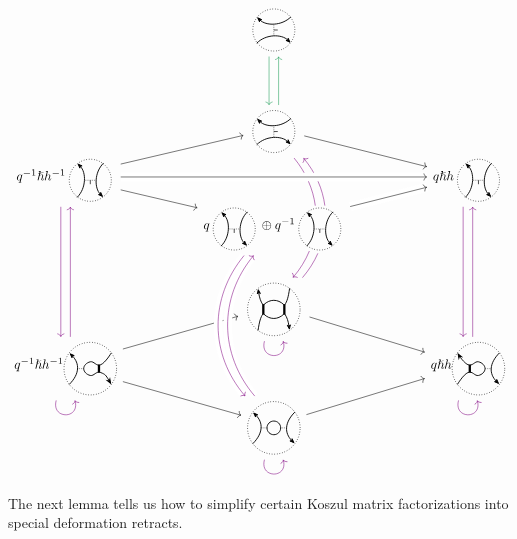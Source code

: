 \documentclass{article}
\theoremstyle{plain} %
\theoremstyle{definition} %
\theoremstyle{remark} %
\begin{document}
\[\label{r2bsdr}
\begin{tikzcd}[row sep=-0.1cm, column sep=2cm]
	&
	\scalebox{0.7}{\UnorientedVerticalThinEdge{}{}{}{}}
	\arrow[d, color=ForestGreen, shift right=1.5]
	&
	\\[4em]&
	\scalebox{0.7}{\UnorientedVerticalThinEdge{}{}{}{}}
	\arrow[dr]
	\arrow[ddd, bend left=40, color=violet, shift right=1.5, dash pattern=on 40pt off 35pt]
	\arrow[leftarrow, ddd, bend left=40, color=violet, shift left=1.5, dash pattern=on 39.5pt off 37pt]
	\arrow[u, color=ForestGreen, shift right=1.5]
	&
	\\
	q^{-1}\hslash h^{-1}\scalebox{0.7}{\UnorientedHorizontalThinEdge{}{}{}{}} 
	\arrow[dr]
	\arrow[ur]
	\arrow[ddd, color=violet, shift right=1.5]
	&
	&
	q\hslash h\scalebox{0.7}{\UnorientedHorizontalThinEdge{}{}{}{}}
	\arrow[ddd, color=violet, shift right=1.5]
	\\
	& 
	q\scalebox{0.7}{\UnorientedHorizontalThinEdge{}{}{}{}}\oplus q^{-1}\scalebox{0.7}{\UnorientedHorizontalThinEdge{}{}{}{}}
	\arrow[ur, crossing over] 
	&
	\\[2em]
	& 
	\scalebox{0.7}{\Square{}{}{}{}{}{}}
	\arrow[loop right, distance=1.5em, in=-75, out=-105, color=violet]
	\arrow[dr]
	&
	\\
	q^{-1}\hslash h^{-1}\scalebox{0.7}{\ThinThickUnoriented{}{}{}{}{}} 
	\arrow[loop right, distance=1.5em, in=-75, out=-105, color=violet]
	\arrow[ur]
	\arrow[dr]
	\arrow[uuu, color=violet, shift right=1.5]
	&& 
	q\hslash h\scalebox{0.7}{\ThickThinUnoriented{}{}{}{}{}}
	\arrow[uuu, color=violet, shift right=1.5]
	\arrow[loop right, distance=1.5em, in=-75, out=-105, color=violet]
	\\
	& 
	\scalebox{0.7}{\ThinThinUnoriented{}{}{}{}{}} 
	\arrow[ur]
	\arrow[loop right, distance=1.5em, in=-75, out=-105, color=violet] 
	&
	\arrow[ddd, from=4-2, to=7-2, bend right=40, crossing over, color=violet, shift right=1.5] 
	\arrow[uuu, from=7-2, to=4-2, bend left=40, crossing over, color=violet, shift right=1.5] 
	\arrow[ur, from=4-2, to=3-3, crossing over] 
	\arrow[rr, from=3-1, to=3-3, crossing over] 
\end{tikzcd}
\]




The next lemma tells us how to simplify certain Koszul matrix factorizations into special deformation retracts.
\end{document}
